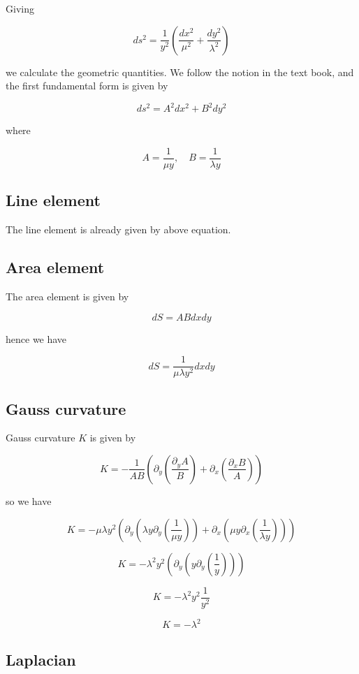 Giving

\[
    ds^2 = \frac{1}{y^2} (\frac{dx^2}{\mu^2} + \frac{dy^2}{\lambda^2})
\]

we calculate the geometric quantities.
We follow the notion in the text book\cite{Needham2021VisualDG}, and the first fundamental form is given by

\[
    ds^2 = A^2 dx^2 + B^2 dy^2
\]

where

\[
    A = \frac{1}{\mu y}, \quad B = \frac{1}{\lambda y}
\]

\subsection{Line element}\label{sec:line-element}

The line element is already given by above equation.

\subsection{Area element}\label{sec:area-element}

The area element is given by

\[
    dS = A B dx dy
\]

hence we have

\[
    dS = \frac{1}{\mu \lambda y^2} dx dy
\]

\subsection{Gauss curvature}\label{sec:curvature-calculations}


Gauss curvature $K$ is given by

\[
    K = - \frac{1}{A B} \left(\partial_y \left(\frac{\partial_y A}{B}\right) + \partial_x \left(\frac{\partial_x B}{A}\right)\right)
\]

so we have

\[
    K = - \mu \lambda y^2 \left(
          \partial_y \left(\lambda y \partial_y \left(\frac{1}{\mu y}\right)\right)
        + \partial_x \left(\mu y \partial_x \left(\frac{1}{\lambda y}\right)\right)
    \right)
\]

\[
    K = - \lambda^2 y^2 \left(
    \partial_y \left( y \partial_y \left(\frac{1}{y} \right)\right)
    \right)
\]

\[
    K = - \lambda^2 y^2 \frac{1}{y^2}
\]

\[
    K = - \lambda^2
\]

\subsection{Laplacian}\label{sec:laplacian-calculations}


